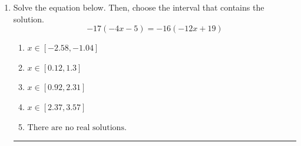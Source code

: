\documentclass[14pt]{extbook}
\newcommand{\litem}[1]{\item#1\hspace*{-1cm}\rule{\textwidth}{0.4pt}}
\begin{document}
\begin{enumerate}
{\begin{enumerate}[label=\Alph*.]
\end{enumerate} }
\litem{
Solve the equation below. Then, choose the interval that contains the solution.\[ -17(-4x -5) = -16(-12x + 19) \]\begin{enumerate}[label=\Alph*.]
\item \( x \in [-2.58, -1.04] \)
\item \( x \in [0.12, 1.3] \)
\item \( x \in [0.92, 2.31] \)
\item \( x \in [2.37, 3.57] \)
\item \( \text{There are no real solutions.} \)

\end{enumerate} }
\end{enumerate}
\end{document}
